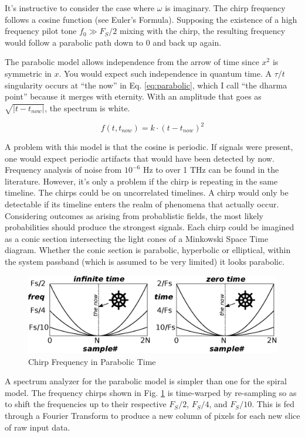 It's instructive to consider the case where $\omega$ is imaginary.
The chirp frequency follows a cosine function (see Euler's Formula).
Supposing the existence of a high frequency pilot tone $f_0 \gg F_S/2$ mixing
with the chirp, the resulting frequency would follow a parabolic path
down to 0 and back up again.

The parabolic model allows independence from the arrow of time since $x^2$ is
symmetric in $x$. You would expect such independence in quantum time.
A $\tau/t$ singularity occurs at ``the now'' in Eq. \ref{eq:parabolic},
which I call ``the dharma point'' because it merges with eternity.
With an amplitude that goes as $\sqrt{|t - t_{now}|}$, the spectrum is white.

\begin{equation} \label{eq:parabolic}
f(t, t_{now}) = k \cdot (t - t_{now})^2
\end{equation}

A problem with this model is that the cosine is periodic.
If signals were present, one would expect periodic artifacts that would have
been detected by now. Frequency analysis of noise
from $10^{-6}$ Hz to over 1 THz can be found in the literature.
However, it's only a problem if the chirp is repeating in the same timeline.
The chirps could be on uncorrelated timelines.
A chirp would only be detectable if its timeline enters the realm of phenomena
that actually occur.
Considering outcomes as arising from probablistic fields,
the most likely probabilities should produce the strongest signals.
Each chirp could be imagined as a conic section intersecting the light cones of
a Minkowski Space Time diagram. 
Whether the conic section is parabolic, hyperbolic or elliptical, within the 
system passband (which is assumed to be very limited) it looks parabolic.

\begin{figure}
    \centering
    \includegraphics[width=0.75\linewidth]{../source/parabola_e}
    \caption[Chirp Frequency in Parabolic Time]{Chirp Frequency in Parabolic Time}
    \label{fig:parabolic}
\end{figure}

A spectrum analyzer for the parabolic model is simpler than one for the spiral model.
The frequency chirps shown in Fig. \ref{fig:parabolic} is time-warped by 
re-sampling so as to shift the frequencies up to their respective
$F_S/2$, $F_S/4$, and $F_S/10$. This is fed through a Fourier Transform to produce
a new column of pixels for each new slice of raw input data.


